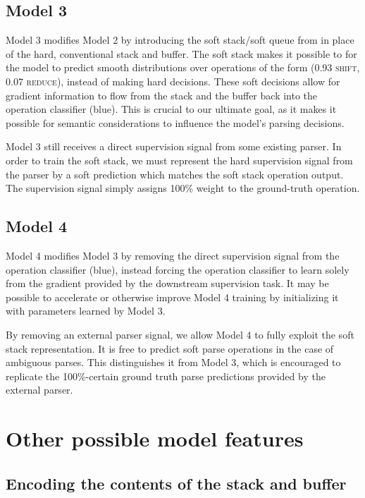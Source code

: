 \documentclass[11pt,letterpaper]{article}
\newcommand{\shift}{\textsc{shift}}
\newcommand{\reduce}{\textsc{reduce}}
\begin{document}
\subsection{Model 3}

Model 3 modifies Model 2 by introducing the soft stack/soft queue from \cite{grefenstette2015learning} in place of the hard, conventional stack and buffer. The soft stack makes it possible to for the model to predict smooth distributions over operations of the form (0.93 \shift, 0.07 \reduce), instead of making hard decisions. These soft decisions allow for gradient information to flow from the stack and the buffer back into the operation classifier (blue). This is crucial to our ultimate goal, as it makes it possible for semantic considerations to influence the model's parsing decisions.

Model 3 still receives a direct supervision signal from some existing parser. In order to train the soft stack, we must represent the hard supervision signal from the parser by a soft prediction which matches the soft stack operation output. The supervision signal simply assigns 100\% weight to the ground-truth operation.

\subsection{Model 4}

Model 4 modifies Model 3 by removing the direct supervision signal from the operation classifier (blue), instead forcing the operation classifier to learn solely from the gradient provided by the downstream supervision task. It may be possible to accelerate or otherwise improve Model 4 training by initializing it with parameters learned by Model 3.

By removing an external parser signal, we allow Model 4 to fully exploit the soft stack representation. It is free to predict soft parse operations in the case of ambiguous parses. This distinguishes it from Model 3, which is encouraged to replicate the 100\%-certain ground truth parse predictions provided by the external parser.

\section{Other possible model features}

\subsection{Encoding the contents of the stack and buffer}
\end{document}
